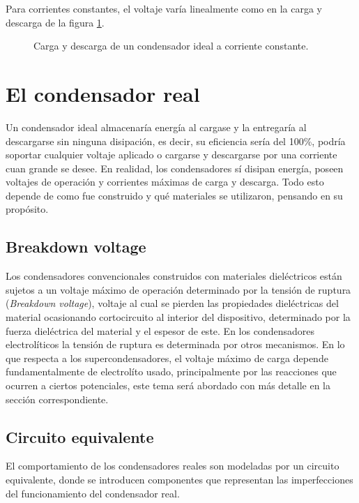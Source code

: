 Para corrientes constantes, el voltaje varía linealmente como en la carga y descarga de la figura \ref{fig:plot:charge-discharge_ideal_cap}.
\begin{figure}[h!]
	\caption{Carga y descarga de un condensador ideal a corriente constante.}
	\label{fig:plot:charge-discharge_ideal_cap}
\end{figure}

\section{El condensador real}
Un condensador ideal almacenaría energía al cargase y la entregaría al descargarse sin ninguna disipación, es decir, su eficiencia sería del 100\%, podría soportar cualquier voltaje aplicado o cargarse y descargarse por una corriente cuan grande se desee.  En realidad, los condensadores sí disipan energía, poseen voltajes de operación y corrientes máximas de carga y descarga. Todo esto depende de como fue construido y qué materiales se utilizaron, pensando en su propósito.

\subsection{Breakdown voltage}
Los condensadores convencionales construidos con materiales dieléctricos están sujetos a un voltaje máximo de operación determinado por la tensión de ruptura (\textit{Breakdown voltage}), voltaje al cual se pierden las propiedades dieléctricas del material ocasionando cortocircuito al interior del dispositivo, determinado por la fuerza dieléctrica del material y el espesor de este. En los condensadores electrolíticos la tensión de ruptura es determinada por otros mecanismos\citep{Yahalom1971}. En lo que respecta a los supercondensadores, el voltaje máximo de carga depende fundamentalmente de electrolíto usado, principalmente por las reacciones que ocurren a ciertos potenciales, este tema será abordado con más detalle en la sección correspondiente.

\subsection{Circuito equivalente}
El comportamiento de los condensadores reales son modeladas por un circuito equivalente, donde se introducen componentes que representan las imperfecciones del funcionamiento del condensador real.\\

